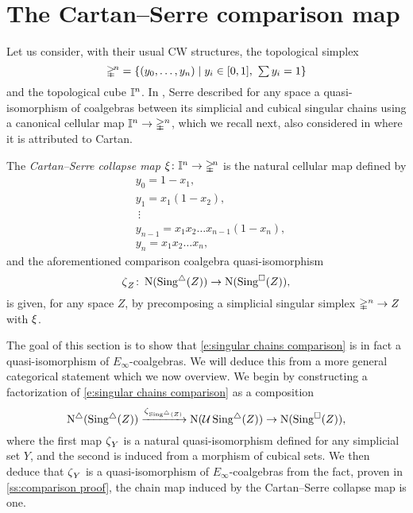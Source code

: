
\section{The Cartan--Serre comparison map} \label{s:the cartan-serre comparison map}

Let us consider, with their usual CW structures, the topological simplex
\[
\mathbb{\Delta}^{\!n} = \{(y_0, \dots, y_n) \mid y_i \in [0,1], \ \textstyle{\sum} \, y_i = 1\}
\]
and the topological cube $\mathbb{I}^n$.
In \cite[p. 442]{serre1951homologie}, Serre described for any space a quasi-isomorphism of coalgebras between its simplicial and cubical singular chains using a canonical cellular map $\mathbb{I}^n \to \mathbb{\Delta}^n$, which we recall next, also considered in \cite[p.199]{eilenberg1953acyclic} where it is attributed to Cartan.

\begin{definition}
	The \textit{Cartan--Serre collapse map} $\operatorname{\xi} \colon \mathbb{I}^n \to \mathbb{\Delta}^{\!n}$ is the natural cellular map defined by
	\begin{equation} \label{e:cartan-serre collapse map}
	\begin{split}
	&y_0 = 1 - x_1, \\
	&y_1 = x_1(1 - x_2), \\
	&\ \vdots \\
	&y_{n-1} = x_1 x_2 \dots x_{n-1}(1-x_n), \\
	&y_{n} = x_1 x_2 \dots x_n,
	\end{split}
	\end{equation}
	and the aforementioned comparison coalgebra quasi-isomorphism
	\begin{equation} \label{e:singular chains comparison}
	\operatorname{\zeta}_Z \colon \operatorname{N}(\operatorname{Sing^{\triangle}}(Z)) \to
	\operatorname{N}(\operatorname{Sing^{\square}}(Z)),
	\end{equation}
	is given, for any space $Z$, by precomposing a simplicial singular simplex $\mathbb{\Delta}^n \to Z$ with $\operatorname{\xi}$.
\end{definition}

The goal of this section is to show that \eqref{e:singular chains comparison} is in fact a quasi-isomorphism of $E_\infty$-coalgebras.
We will deduce this from a more general categorical statement which we now overview.
We begin by constructing a factorization of \eqref{e:singular chains comparison} as a composition
\[
\operatorname{N^{\triangle}}(\operatorname{Sing^{\triangle}}(Z)) \xrightarrow{\operatorname{\zeta}_{\operatorname{Sing^{\triangle}}(Z)}}
\operatorname{N}(\operatorname{\mathcal{U}} \operatorname{Sing^{\triangle}}(Z)) \to
\operatorname{N}(\operatorname{Sing^{\square}}(Z)),
\]
where the first map $\operatorname{\zeta}_Y$ is a natural quasi-isomorphism defined for any simplicial set $Y$, and the second is induced from a morphism of cubical sets.
We then deduce that $\operatorname{\zeta}_Y$ is a quasi-isomorphism of $E_\infty$-coalgebras from the fact, proven in \cref{ss:comparison proof}, the chain map induced by the Cartan--Serre collapse map is one.

